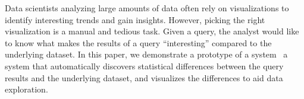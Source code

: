 % 
Data scientists analyzing large amounts of data often rely on visualizations to
identify interesting trends and gain insights. However, picking the right
visualization is a manual and tedious task. Given a query, the analyst would
like to know what makes the results of a query ``interesting'' compared to the
underlying dataset. In this paper, we demonstrate a prototype of a system
\SeeDB\, a system that automatically discovers statistical differences between
the query results and the underlying dataset, and visualizes the differences to
aid data exploration.
